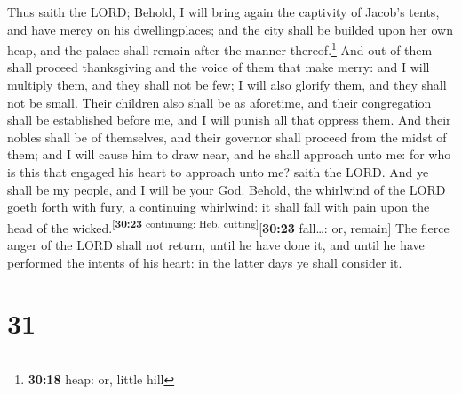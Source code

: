  Thus saith the LORD; Behold, I will bring again the
captivity of Jacob's tents, and have mercy on his dwellingplaces; and
the city shall be builded upon her own heap, and the palace shall remain
after the manner thereof.\footnote{\textbf{30:18} heap: or, little hill}
 And out of them shall proceed thanksgiving and the voice
of them that make merry: and I will multiply them, and they shall not be
few; I will also glorify them, and they shall not be small.
 Their children also shall be as aforetime, and their
congregation shall be established before me, and I will punish all that
oppress them.  And their nobles shall be of themselves,
and their governor shall proceed from the midst of them; and I will
cause him to draw near, and he shall approach unto me: for who is this
that engaged his heart to approach unto me? saith the LORD.
 And ye shall be my people, and I will be your God.
 Behold, the whirlwind of the LORD goeth forth with fury,
a continuing whirlwind: it shall fall with pain upon the head of the
wicked.\textsuperscript{{[}\textbf{30:23} continuing: Heb.
cutting{]}}{[}\textbf{30:23} fall\ldots: or, remain{]} 
The fierce anger of the LORD shall not return, until he have done it,
and until he have performed the intents of his heart: in the latter days
ye shall consider it.

\hypertarget{section-30}{%
\section{31}\label{section-30}}

